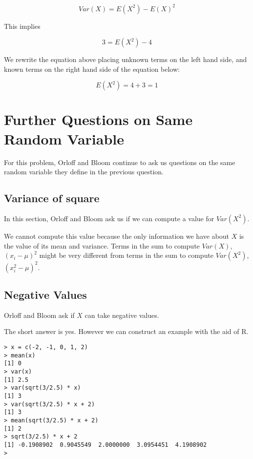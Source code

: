 \documentclass[a4paper,11pt]{article}
\begin{document}
\begin{equation}
	Var \left( X \right) = E \left( X^{2} \right) - E \left( X\right)^{2}
\end{equation}

This implies

\begin{equation}
	3 = E \left( X^{2} \right) - 4
\end{equation}

We rewrite the equation above placing unknown terms on the left hand side,
and known terms on the right hand side of the equation below:

\begin{equation}
	E \left( X^{2} \right) =  4 + 3 = 1
\end{equation}

\section{Further Questions on Same Random Variable}
For this problem, Orloff and Bloom continue to ask us questions on the same
random variable they define in the previous question.

\subsection{Variance of square}
In this section, Orloff and Bloom ask us if we can compute a value for
$Var \left( X^{2} \right)$.

We cannot compute this value because the only information we have about $X$ is
the value of its mean and variance. Terms in the sum to compute
$Var \left( X \right)$,  $ \left( x_{i} - \mu \right)^{2}$
might be very different from terms in the sum to compute
$Var \left( X^{2} \right)$, $\left( x_{i}^{2} - \mu \right)^{2}$.

\subsection{Negative Values}
Orloff and Bloom ask if $X$ can take negative values.

The short answer is yes.  However we can construct an example with the aid
of R.

\begin{lstlisting}
> x = c(-2, -1, 0, 1, 2)
> mean(x)
[1] 0
> var(x)
[1] 2.5
> var(sqrt(3/2.5) * x)
[1] 3
> var(sqrt(3/2.5) * x + 2)
[1] 3
> mean(sqrt(3/2.5) * x + 2)
[1] 2
> sqrt(3/2.5) * x + 2
[1] -0.1908902  0.9045549  2.0000000  3.0954451  4.1908902
>
\end{lstlisting}
\end{document}

